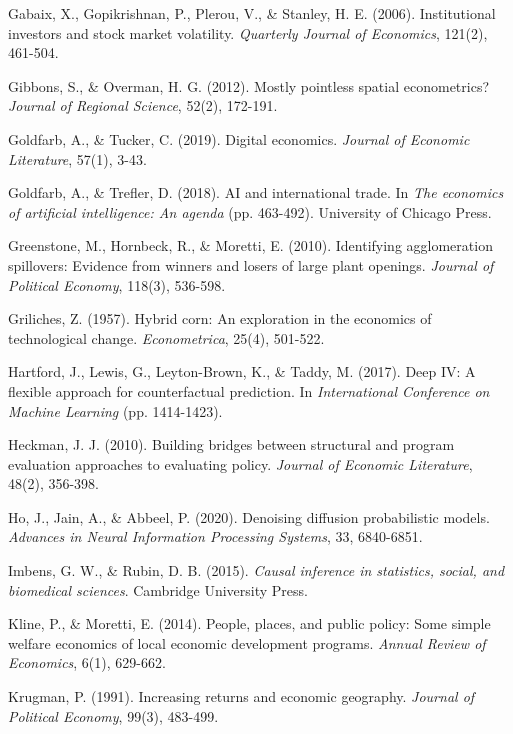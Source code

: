 \begin{thebibliography}{99}
Gabaix, X., Gopikrishnan, P., Plerou, V., \& Stanley, H. E. (2006). Institutional investors and stock market volatility. \textit{Quarterly Journal of Economics}, 121(2), 461-504.

Gibbons, S., \& Overman, H. G. (2012). Mostly pointless spatial econometrics? \textit{Journal of Regional Science}, 52(2), 172-191.

Goldfarb, A., \& Tucker, C. (2019). Digital economics. \textit{Journal of Economic Literature}, 57(1), 3-43.

Goldfarb, A., \& Trefler, D. (2018). AI and international trade. In \textit{The economics of artificial intelligence: An agenda} (pp. 463-492). University of Chicago Press.

Greenstone, M., Hornbeck, R., \& Moretti, E. (2010). Identifying agglomeration spillovers: Evidence from winners and losers of large plant openings. \textit{Journal of Political Economy}, 118(3), 536-598.

Griliches, Z. (1957). Hybrid corn: An exploration in the economics of technological change. \textit{Econometrica}, 25(4), 501-522.

Hartford, J., Lewis, G., Leyton-Brown, K., \& Taddy, M. (2017). Deep IV: A flexible approach for counterfactual prediction. In \textit{International Conference on Machine Learning} (pp. 1414-1423).

Heckman, J. J. (2010). Building bridges between structural and program evaluation approaches to evaluating policy. \textit{Journal of Economic Literature}, 48(2), 356-398.

Ho, J., Jain, A., \& Abbeel, P. (2020). Denoising diffusion probabilistic models. \textit{Advances in Neural Information Processing Systems}, 33, 6840-6851.

Imbens, G. W., \& Rubin, D. B. (2015). \textit{Causal inference in statistics, social, and biomedical sciences}. Cambridge University Press.

Kline, P., \& Moretti, E. (2014). People, places, and public policy: Some simple welfare economics of local economic development programs. \textit{Annual Review of Economics}, 6(1), 629-662.

Krugman, P. (1991). Increasing returns and economic geography. \textit{Journal of Political Economy}, 99(3), 483-499.


\end{thebibliography}
